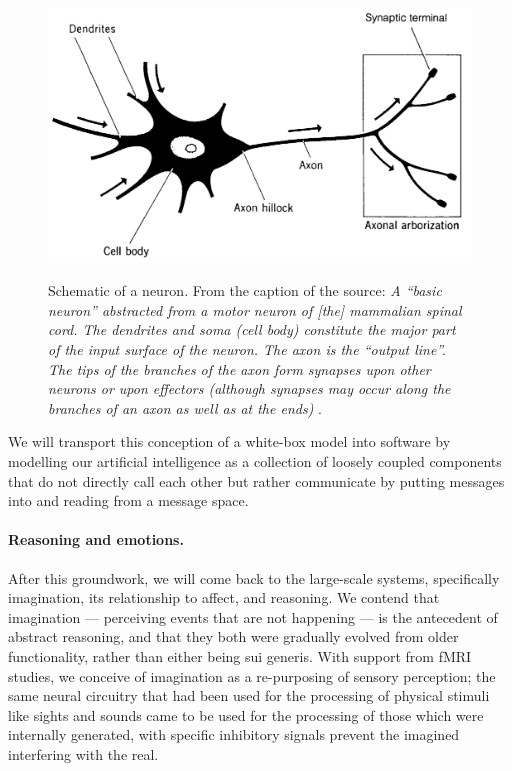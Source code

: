 \begin{figure}
	\centering
	\includegraphics[width=\textwidth]{Figs/neuron.png}
	\label{fig:neuron}
	\caption{Schematic of a neuron. From the caption of the source: \emph{A ``basic neuron'' abstracted from a motor neuron of [the] mammalian spinal cord. The dendrites and soma (cell body) constitute the major part of the input surface of the neuron. The axon is the ``output line''. The tips of the branches of the axon form synapses upon other neurons or upon effectors (although synapses may occur along the branches of an axon as well as at the ends)} \cite[p.\ 52]{arbib1989}.}
\end{figure}

We will transport this conception of a white-box model into software by modelling our artificial intelligence as a collection of loosely coupled components that do not directly call each other but rather communicate by putting messages into and reading from a message space.

\paragraph{Reasoning and emotions.} After this groundwork, we will come back to the large-scale systems, specifically imagination, its relationship to affect, and reasoning. We contend that imagination --- perceiving events that are not happening --- is the antecedent of abstract reasoning, and that they both were gradually evolved from older functionality, rather than either being sui generis. With support from fMRI studies, we conceive of imagination as a re-purposing of sensory perception; the same neural circuitry that had been used for the processing of physical stimuli like sights and sounds came to be used for the processing of those which were internally generated, with specific inhibitory signals prevent the imagined interfering with the real.

